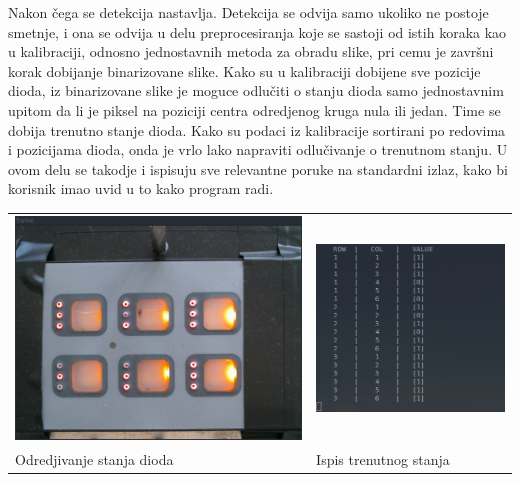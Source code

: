 \documentclass[a4paper,12pt, projekat]{etf}
\begin{document}
        Nakon \v{c}ega se detekcija nastavlja. Detekcija se odvija samo ukoliko ne postoje
        smetnje, i ona se odvija u delu preprocesiranja koje se sastoji od
        istih koraka kao u kalibraciji, odnosno jednostavnih metoda za obradu
        slike, pri cemu je zavr\v{s}ni korak dobijanje binarizovane slike. Kako su u
        kalibraciji dobijene sve pozicije dioda, iz binarizovane slike je
        moguce odlu\v{c}iti o stanju dioda samo jednostavnim upitom da li je piksel
        na poziciji centra odredjenog kruga nula ili jedan. Time se dobija
        trenutno stanje dioda. Kako su podaci iz kalibracije sortirani po
        redovima i pozicijama dioda, onda je vrlo lako napraviti odlu\v{c}ivanje o
        trenutnom stanju. U ovom delu se takodje i ispisuju sve relevantne
        poruke na standardni izlaz, kako bi korisnik imao uvid u to kako
        program radi.

        \begin{table}[h!]
            \begin{tabular}{ll}
                \includegraphics[scale=0.3]{firstKey.png} &
                \includegraphics[scale=0.4]{firstRep.png} \\
                Odredjivanje stanja dioda &
                Ispis trenutnog stanja
            \end{tabular}
        \end{table}
\end{document}
